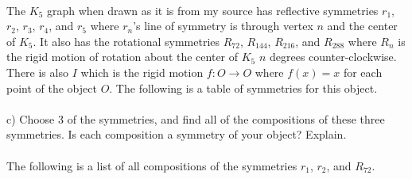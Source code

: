 \documentclass[11pt,a4paper]{article}
\begin{document}
~\\
The $K_5$ graph when drawn as it is from my source has reflective symmetries $r_1$, $r_2$, $r_3$, $r_4$, and $r_5$ where $r_n$'s line of symmetry is through vertex $n$ and the center of $K_5$. It also has the rotational symmetries $R_{72}$, $R_{144}$, $R_{216}$, and $R_{288}$ where $R_n$ is the rigid motion of rotation about the center of $K_5$ $n$ degrees counter-clockwise. There is also $I$ which is the rigid motion $f:O\rightarrow O$ where $f(x)=x$ for each point of the object $O$. The following is a table of symmetries for this object.\\
~\\
c) Choose 3 of the symmetries, and find all of the compositions of these three symmetries. Is each composition a symmetry of your object? Explain.\\
~\\
The following is a list of all compositions of the symmetries $r_1$, $r_2$, and $R_72$.
\end{document}

